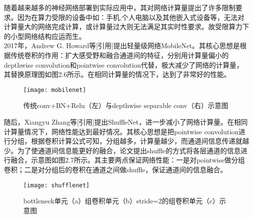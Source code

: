 随着越来越多的神经网络部署到实际应用中，其对网络计算量提出了许多限制要求。因为在算力受限的设备中如：手机,个人电脑以及其他嵌入式设备等，无法对计算量大的网络完成计算，或计算量过大则无法满足其实时性要求。故受限算力下的小型网络结构应运而生。\\
2017年，Andrew G. Howard等[引用]提出轻量级网络MobileNet。其核心思想是根据传统卷积的作用：扩大感受野和融合通道间的特征，分别用计算量偏小的depthwise convolution和pointwise convolution代替，极大减少了网络的计算量，其替换原理图如图2.6所示。在相同计算量的情况下，达到了非常好的性能。\\
\begin{figure}[htp]
\centering
\texttt{[image: mobilenet]}
\caption{传统conv+BN+Relu（左）与depthwise separable conv（右）示意图}
\end{figure}
随后，Xiangyu Zhang等[引用]提出ShuffleNet，进一步减小了网络计算量。在相同计算量情况下，网络性能达到最好情况。其核心思想是把pointwise convolution进行分组，根据卷积计算公式可知，分组越多，计算量越少，而通道间信息传递就越少。为了使通道间信息能更好的融合，论文提出shuffle的方式将各层通道的信息进行融合，示意图如图2.7所示。其主要两点保证网络性能：一是对pointwise做分组卷积；二是对分组后的卷积在通道之间做shuffle，保证通道间的信息融合。\\
\begin{figure}[htp]
\centering
\texttt{[image: shufflenet]}
\caption{bottleneck单元（a）组卷积单元（b）stride=2的组卷积单元（c）示意图}
\end{figure}
